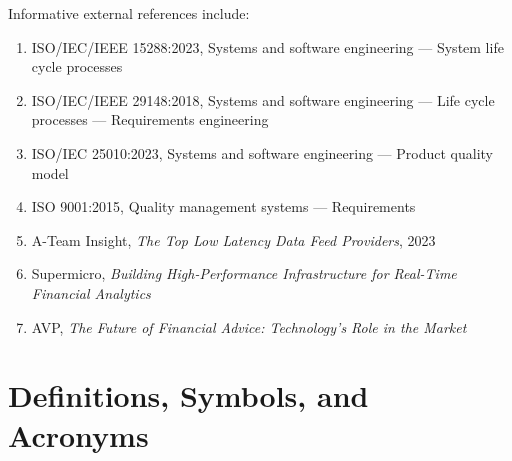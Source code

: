 \documentclass[11pt]{report}
\begin{document}
Informative external references include:
\begin{enumerate}[leftmargin=1.2cm]
    \item ISO/IEC/IEEE 15288:2023, Systems and software engineering --- System life cycle processes
    \item ISO/IEC/IEEE 29148:2018, Systems and software engineering --- Life cycle processes --- Requirements engineering
    \item ISO/IEC 25010:2023, Systems and software engineering --- Product quality model
    \item ISO 9001:2015, Quality management systems --- Requirements
    \item A-Team Insight, \emph{The Top Low Latency Data Feed Providers}, 2023
    \item Supermicro, \emph{Building High-Performance Infrastructure for Real-Time Financial Analytics}
    \item AVP, \emph{The Future of Financial Advice: Technology's Role in the Market}
\end{enumerate}

\chapter{Definitions, Symbols, and Acronyms}
\end{document}

